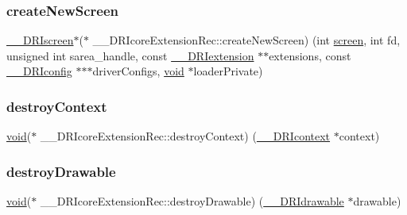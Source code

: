 \subsubsection{\texorpdfstring{create\+New\+Screen}{createNewScreen}}
{\footnotesize\ttfamily \hyperlink{dri__interface_8h_a9961b01d421ee1fd6ed3c05acc9ca561}{\+\_\+\+\_\+\+D\+R\+Iscreen}$\ast$($\ast$ \+\_\+\+\_\+\+D\+R\+Icore\+Extension\+Rec\+::create\+New\+Screen) (int \hyperlink{cad_8h_ae04e09e4e3831bfc1632c509ae37dcec}{screen}, int fd, unsigned int sarea\+\_\+handle, const \hyperlink{dri__interface_8h_a4e0a61c8ece00d2b2c6792a9a1b55385}{\+\_\+\+\_\+\+D\+R\+Iextension} $\ast$$\ast$extensions, const \hyperlink{dri__interface_8h_aeac81999efbbf8b1d6886338e3ea24d9}{\+\_\+\+\_\+\+D\+R\+Iconfig} $\ast$$\ast$$\ast$driver\+Configs, \hyperlink{_s_d_l__opengles2__gl2ext_8h_ae5d8fa23ad07c48bb609509eae494c95}{void} $\ast$loader\+Private)}

\mbox{\label{struct_____d_r_icore_extension_rec_aebb9ddac0852b22a75568195c64e3e54}} 
\subsubsection{\texorpdfstring{destroy\+Context}{destroyContext}}
{\footnotesize\ttfamily \hyperlink{_s_d_l__opengles2__gl2ext_8h_ae5d8fa23ad07c48bb609509eae494c95}{void}($\ast$ \+\_\+\+\_\+\+D\+R\+Icore\+Extension\+Rec\+::destroy\+Context) (\hyperlink{dri__interface_8h_a3fd295cba82b5a3d79f1ee7e12bfb908}{\+\_\+\+\_\+\+D\+R\+Icontext} $\ast$context)}

\mbox{\label{struct_____d_r_icore_extension_rec_a3ddbdbe3193d26ea0d60b84dbaf91170}} 
\subsubsection{\texorpdfstring{destroy\+Drawable}{destroyDrawable}}
{\footnotesize\ttfamily \hyperlink{_s_d_l__opengles2__gl2ext_8h_ae5d8fa23ad07c48bb609509eae494c95}{void}($\ast$ \+\_\+\+\_\+\+D\+R\+Icore\+Extension\+Rec\+::destroy\+Drawable) (\hyperlink{dri__interface_8h_a5bfb832a0a08208d95b3bbef439d2262}{\+\_\+\+\_\+\+D\+R\+Idrawable} $\ast$drawable)}

